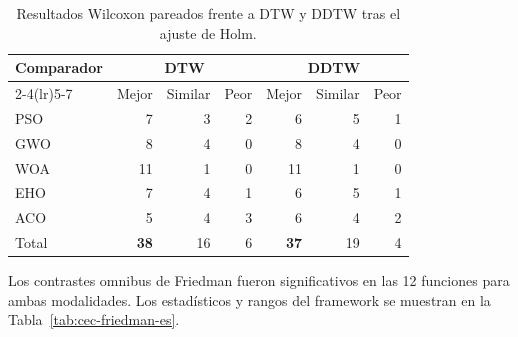 \begin{table}[htbp]
\centering
\caption{Resultados Wilcoxon pareados frente a DTW y DDTW tras el ajuste de Holm.}
\label{tab:cec-resultados-es}
\begin{tabular}{lrrrrrr}
\toprule
Comparador & \multicolumn{3}{c}{DTW} & \multicolumn{3}{c}{DDTW} \\
\cmidrule(lr){2-4}\cmidrule(lr){5-7}
 & Mejor & Similar & Peor & Mejor & Similar & Peor \\
\midrule
PSO & 7 & 3 & 2 & 6 & 5 & 1 \\
GWO & 8 & 4 & 0 & 8 & 4 & 0 \\
WOA & 11 & 1 & 0 & 11 & 1 & 0 \\
EHO & 7 & 4 & 1 & 6 & 5 & 1 \\
ACO & 5 & 4 & 3 & 6 & 4 & 2 \\
\midrule
Total & \textbf{38} & 16 & 6 & \textbf{37} & 19 & 4 \\
\bottomrule
\end{tabular}
\end{table}

Los contrastes omnibus de Friedman fueron significativos en las 12 funciones
para ambas modalidades. Los estad\'isticos y rangos del framework se muestran
en la Tabla~\ref{tab:cec-friedman-es}.

